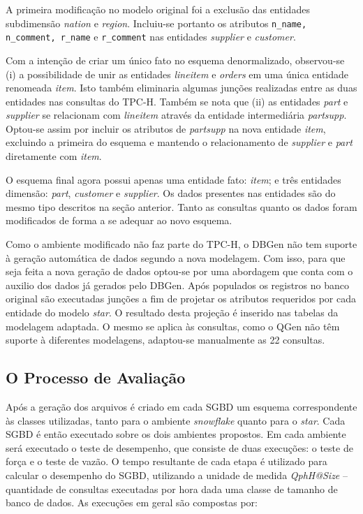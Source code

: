 \documentclass[conference]{IEEEtran}
\begin{document}
A primeira modificação no modelo original foi a exclusão das entidades subdimensão \textit{nation} e \textit{region}. Incluiu-se portanto os atributos \texttt{n\_name, n\_comment, r\_name} e \texttt{r\_comment} nas entidades \textit{supplier} e \textit{customer}. 

Com a intenção de criar um único fato no esquema denormalizado, observou-se (i) a possibilidade de unir as entidades \textit{lineitem} e \textit{orders} em uma única entidade renomeada \textit{item}. Isto também eliminaria algumas junções realizadas entre as duas entidades nas consultas do TPC-H. Também se nota que (ii) as entidades \textit{part} e \textit{supplier} se relacionam com \textit{lineitem} através da entidade intermediária \textit{partsupp}. Optou-se assim por incluir os atributos de \textit{partsupp} na nova entidade \textit{item}, excluindo a primeira do esquema e mantendo o relacionamento de \textit{supplier} e \textit{part} diretamente com \textit{item}.

O esquema final agora possui apenas uma entidade fato: \textit{item}; e três entidades dimensão: \textit{part}, \textit{customer} e \textit{supplier}. Os dados presentes nas entidades são do mesmo tipo descritos na seção anterior. Tanto as consultas quanto os dados foram modificados de forma a se adequar ao novo esquema.

Como o ambiente modificado não faz parte do TPC-H, o DBGen não tem suporte à geração automática de dados segundo a nova modelagem. Com isso, para que seja feita a nova geração de dados optou-se por uma abordagem que conta com o auxilio dos dados já gerados pelo DBGen. Após populados os registros no banco original são executadas junções a fim de projetar os atributos requeridos por cada entidade do modelo \textit{star}. O resultado desta projeção é inserido nas tabelas da modelagem adaptada. O mesmo se aplica às consultas, como o QGen não têm suporte à diferentes modelagens, adaptou-se manualmente as 22 consultas.

\subsection{O Processo de Avaliação}

Após a geração dos arquivos é criado em cada SGBD um esquema correspondente às classes utilizadas, tanto para o ambiente \textit{snowflake} quanto para o \textit{star}. Cada SGBD é então executado sobre os dois ambientes propostos. Em cada ambiente será executado o teste de desempenho, que consiste de duas execuções: o teste de força e o teste de vazão. O tempo resultante de cada etapa é utilizado para calcular o desempenho do SGBD, utilizando a unidade de medida \textit{QphH@Size} -- quantidade de consultas executadas por hora dada uma classe de tamanho de banco de dados. As execuções em geral são compostas por:
\end{document}
